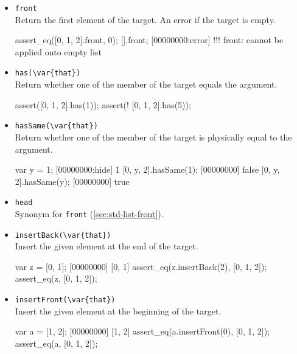 \begin{itemize}
\begin{urbiscript}[firstnumber=last]
\end{urbiscript}

\item \lstinline|front|\\
\label{sec:std-list-front}
Return the first element of the target. An error if the target is
empty.

\begin{urbiscript}[firstnumber=last]
assert_eq([0, 1, 2].front, 0);
[].front;
[00000000:error] !!! front: cannot be applied onto empty list
\end{urbiscript}

\item \lstinline|has(\var{that})|\\
Return whether one of the member of the target equals the argument.

\begin{urbiscript}[firstnumber=last]
assert([0, 1, 2].has(1));
assert(! [0, 1, 2].has(5));
\end{urbiscript}

\item \lstinline|hasSame(\var{that})|\\

Return whether one of the member of the target is physically equal to
the argument.

\begin{urbiscript}[firstnumber=last]
var y = 1;
[00000000:hide] 1
[0, y, 2].hasSame(1);
[00000000] false
[0, y, 2].hasSame(y);
[00000000] true
\end{urbiscript}

\item \lstinline|head|\\
Synonym for \lstinline|front| (\autoref{sec:std-list-front}).

\item \lstinline|insertBack(\var{that})|\\
\label{sec:std-list-pushback}
Insert the given element at the end of the target.

\begin{urbiscript}[firstnumber=last]
var z = [0, 1];
[00000000] [0, 1]
assert_eq(z.insertBack(2), [0, 1, 2]);
assert_eq(z, [0, 1, 2]);
\end{urbiscript}

\item \lstinline|insertFront(\var{that})|\\
Insert the given element at the beginning of the target.

\begin{urbiscript}[firstnumber=last]
var a = [1, 2];
[00000000] [1, 2]
assert_eq(a.insertFront(0), [0, 1, 2]);
assert_eq(a, [0, 1, 2]);
\end{urbiscript}


\end{itemize}
